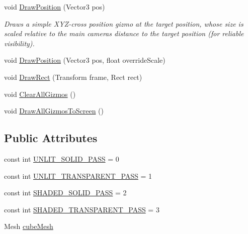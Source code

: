 \begin{DoxyCompactItemize}
void \mbox{\hyperlink{class_leap_1_1_unity_1_1_runtime_gizmos_1_1_runtime_gizmo_drawer_a16125428988c795ef3da1b83af7dc63d}{Draw\+Position}} (Vector3 pos)
\begin{DoxyCompactList}\small\item\em Draws a simple X\+Y\+Z-\/cross position gizmo at the target position, whose size is scaled relative to the main camera\textquotesingle{}s distance to the target position (for reliable visibility). \end{DoxyCompactList}\item 
void \mbox{\hyperlink{class_leap_1_1_unity_1_1_runtime_gizmos_1_1_runtime_gizmo_drawer_a6902f972fcd982162b60aee63490fecc}{Draw\+Position}} (Vector3 pos, float override\+Scale)
\item 
void \mbox{\hyperlink{class_leap_1_1_unity_1_1_runtime_gizmos_1_1_runtime_gizmo_drawer_a9f67b07d4720921c38ec3c6f0aa0f9fa}{Draw\+Rect}} (Transform frame, Rect rect)
\item 
void \mbox{\hyperlink{class_leap_1_1_unity_1_1_runtime_gizmos_1_1_runtime_gizmo_drawer_a3997e67f725121479b6d305b02defe79}{Clear\+All\+Gizmos}} ()
\item 
void \mbox{\hyperlink{class_leap_1_1_unity_1_1_runtime_gizmos_1_1_runtime_gizmo_drawer_ae75ab0c30034af8cbc2aaf967c2136c3}{Draw\+All\+Gizmos\+To\+Screen}} ()
\end{DoxyCompactItemize}
\subsection*{Public Attributes}
\begin{DoxyCompactItemize}
\item 
const int \mbox{\hyperlink{class_leap_1_1_unity_1_1_runtime_gizmos_1_1_runtime_gizmo_drawer_ac17adbc2827a23b0ab6220fff79c6d0f}{U\+N\+L\+I\+T\+\_\+\+S\+O\+L\+I\+D\+\_\+\+P\+A\+SS}} = 0
\item 
const int \mbox{\hyperlink{class_leap_1_1_unity_1_1_runtime_gizmos_1_1_runtime_gizmo_drawer_aacc946cead4467dc85fedd17d79be28b}{U\+N\+L\+I\+T\+\_\+\+T\+R\+A\+N\+S\+P\+A\+R\+E\+N\+T\+\_\+\+P\+A\+SS}} = 1
\item 
const int \mbox{\hyperlink{class_leap_1_1_unity_1_1_runtime_gizmos_1_1_runtime_gizmo_drawer_a2dfec095c4320e0e304acf49be0c8ae3}{S\+H\+A\+D\+E\+D\+\_\+\+S\+O\+L\+I\+D\+\_\+\+P\+A\+SS}} = 2
\item 
const int \mbox{\hyperlink{class_leap_1_1_unity_1_1_runtime_gizmos_1_1_runtime_gizmo_drawer_a63404963de208ae8f163224716852a2d}{S\+H\+A\+D\+E\+D\+\_\+\+T\+R\+A\+N\+S\+P\+A\+R\+E\+N\+T\+\_\+\+P\+A\+SS}} = 3
\item 
Mesh \mbox{\hyperlink{class_leap_1_1_unity_1_1_runtime_gizmos_1_1_runtime_gizmo_drawer_a88620e1b82672b2a25157d2ebf542aaf}{cube\+Mesh}}
\end{DoxyCompactItemize}
